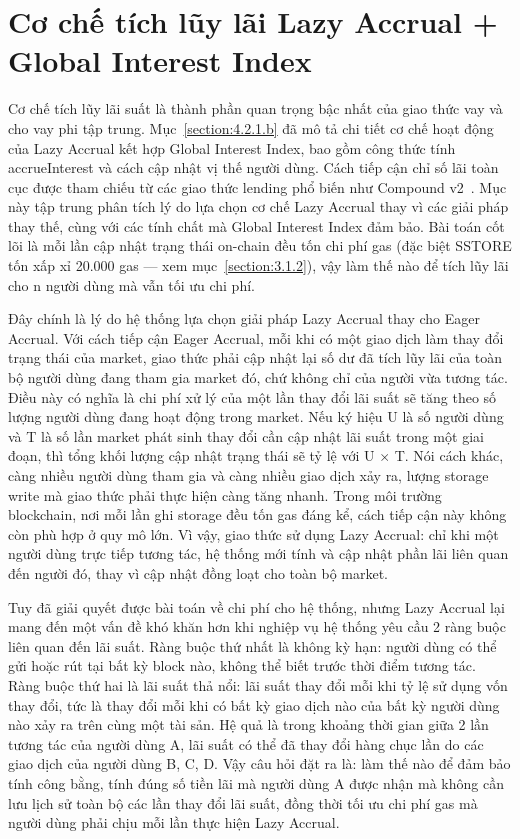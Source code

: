 \documentclass[../DoAn.tex]{subfiles}
\begin{document}
\section{Cơ chế tích lũy lãi Lazy Accrual + Global Interest Index}
\label{section:5.1}


Cơ chế tích lũy lãi suất là thành phần quan trọng bậc nhất của giao thức vay và cho vay phi tập trung. Mục~\ref{section:4.2.1.b} đã mô tả chi tiết cơ chế hoạt động của Lazy Accrual kết hợp Global Interest Index, bao gồm công thức tính accrueInterest và cách cập nhật vị thế người dùng. Cách tiếp cận chỉ số lãi toàn cục được tham chiếu từ các giao thức lending phổ biến như Compound v2~\cite{CompoundV2Docs}. Mục này tập trung phân tích lý do lựa chọn cơ chế Lazy Accrual thay vì các giải pháp thay thế, cùng với các tính chất mà Global Interest Index đảm bảo. Bài toán cốt lõi là mỗi lần cập nhật trạng thái on-chain đều tốn chi phí gas (đặc biệt SSTORE tốn xấp xỉ 20.000 gas --- xem mục~\ref{section:3.1.2}), vậy làm thế nào để tích lũy lãi cho n người dùng mà vẫn tối ưu chi phí.

Đây chính là lý do hệ thống lựa chọn giải pháp Lazy Accrual thay cho Eager Accrual. Với cách tiếp cận Eager Accrual, mỗi khi có một giao dịch làm thay đổi trạng thái của market, giao thức phải cập nhật lại số dư đã tích lũy lãi của toàn bộ người dùng đang tham gia market đó, chứ không chỉ của người vừa tương tác. Điều này có nghĩa là chi phí xử lý của một lần thay đổi lãi suất sẽ tăng theo số lượng người dùng đang hoạt động trong market. Nếu ký hiệu U là số người dùng và T là số lần market phát sinh thay đổi cần cập nhật lãi suất trong một giai đoạn, thì tổng khối lượng cập nhật trạng thái sẽ tỷ lệ với U $\times$ T. Nói cách khác, càng nhiều người dùng tham gia và càng nhiều giao dịch xảy ra, lượng storage write mà giao thức phải thực hiện càng tăng nhanh. Trong môi trường blockchain, nơi mỗi lần ghi storage đều tốn gas đáng kể, cách tiếp cận này không còn phù hợp ở quy mô lớn. Vì vậy, giao thức sử dụng Lazy Accrual: chỉ khi một người dùng trực tiếp tương tác, hệ thống mới tính và cập nhật phần lãi liên quan đến người đó, thay vì cập nhật đồng loạt cho toàn bộ market.

Tuy đã giải quyết được bài toán về chi phí cho hệ thống, nhưng Lazy Accrual lại mang đến một vấn đề khó khăn hơn khi nghiệp vụ hệ thống yêu cầu 2 ràng buộc liên quan đến lãi suất. Ràng buộc thứ nhất là không kỳ hạn: người dùng có thể gửi hoặc rút tại bất kỳ block nào, không thể biết trước thời điểm tương tác. Ràng buộc thứ hai là lãi suất thả nổi: lãi suất thay đổi mỗi khi tỷ lệ sử dụng vốn thay đổi, tức là thay đổi mỗi khi có bất kỳ giao dịch nào của bất kỳ người dùng nào xảy ra trên cùng một tài sản. Hệ quả là trong khoảng thời gian giữa 2 lần tương tác của người dùng A, lãi suất có thể đã thay đổi hàng chục lần do các giao dịch của người dùng B, C, D. Vậy câu hỏi đặt ra là: làm thế nào để đảm bảo tính công bằng, tính đúng số tiền lãi mà người dùng A được nhận mà không cần lưu lịch sử toàn bộ các lần thay đổi lãi suất, đồng thời tối ưu chi phí gas mà người dùng phải chịu mỗi lần thực hiện Lazy Accrual.
\end{document}
